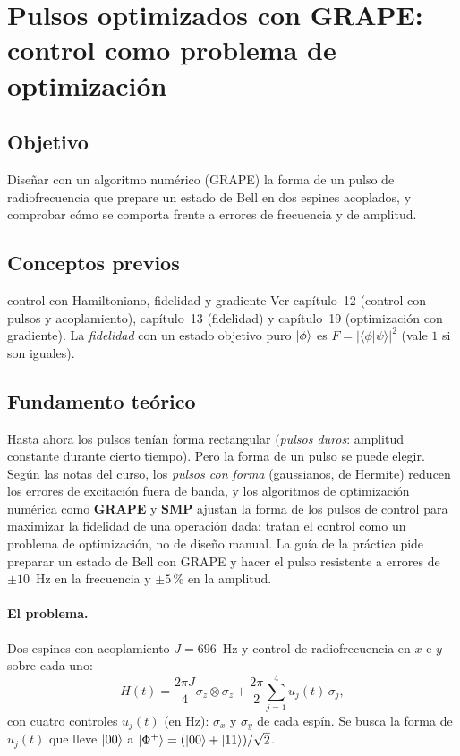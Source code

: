 \def\tituloconcepto{Pulsos optimizados con GRAPE}


\section{Pulsos optimizados con GRAPE: control como problema de optimización}

\subsection{Objetivo}
Diseñar con un algoritmo numérico (GRAPE) la forma de un pulso de
radiofrecuencia que prepare un estado de Bell en dos espines acoplados, y
comprobar cómo se comporta frente a errores de frecuencia y de amplitud.

\subsection{Conceptos previos}
\begin{concepto}{control con Hamiltoniano, fidelidad y gradiente}
Ver capítulo~12 (control con pulsos y acoplamiento), capítulo~13 (fidelidad) y
capítulo~19 (optimización con gradiente). La \emph{fidelidad} con un estado
objetivo puro $\left|\phi\right\rangle$ es $F=|\langle\phi|\psi\rangle|^2$ (vale $1$ si son
iguales).
\end{concepto}

\subsection{Fundamento teórico}
Hasta ahora los pulsos tenían forma rectangular (\emph{pulsos duros}: amplitud
constante durante cierto tiempo). Pero la forma de un pulso se puede elegir.
Según las notas del curso, los \emph{pulsos con forma} (gaussianos, de Hermite)
reducen los errores de excitación fuera de banda, y los algoritmos de
optimización numérica como \textbf{GRAPE} y \textbf{SMP} ajustan la forma de los
pulsos de control para maximizar la fidelidad de una operación dada: tratan el
control como un problema de optimización, no de diseño manual. La guía de la
práctica pide preparar un estado de Bell con GRAPE y hacer el pulso resistente a
errores de $\pm10$~Hz en la frecuencia y $\pm5$\,\% en la amplitud.

\paragraph{El problema.} Dos espines con acoplamiento $J=696$~Hz y control de
radiofrecuencia en $x$ e $y$ sobre cada uno:
\begin{equation}
  H(t)=\frac{2\pi J}{4}\sigma_z\otimes\sigma_z
  +\frac{2\pi}{2}\sum_{j=1}^{4}u_j(t)\,\sigma_j ,
\end{equation}
con cuatro controles $u_j(t)$ (en Hz): $\sigma_x$ y $\sigma_y$ de cada espín. Se
busca la forma de $u_j(t)$ que lleve $\left|00\right\rangle$ a $\left|\Phi^+\right\rangle=(\left|00\right\rangle+\left|11\right\rangle)/\sqrt2$.

